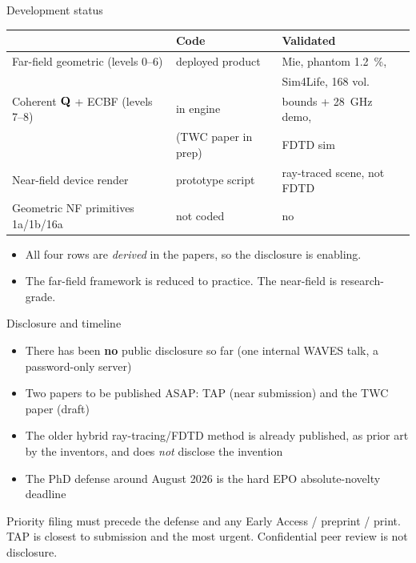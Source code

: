 \documentclass[aspectratio=169, 10pt]{beamer}
\begin{document}
\begin{frame}[t]{Development status}
  \vspace{4pt}
  \begin{center}\small\setlength{\tabcolsep}{4.5pt}
  \begin{tabular}{l l l}
    \toprule
    & Code & Validated \\
    \midrule
    Far-field geometric (levels 0--6) & deployed product & Mie, phantom \SI{1.2}{\percent}, \\
                                      &                   & Sim4Life, 168 vol. \\
    Coherent $\mathbf{Q}$ + ECBF (levels 7--8) & in engine & bounds + \SI{28}{\giga\hertz} demo, \\
                                        & (TWC paper in prep) & FDTD sim \\
    Near-field device render          & prototype script & ray-traced scene, not FDTD \\
    Geometric NF primitives 1a/1b/16a & not coded & no \\
    \bottomrule
  \end{tabular}
  \end{center}

  \vspace{6pt}
  \begin{itemize}
    \item All four rows are \emph{derived} in the papers, so the disclosure is enabling.
    \item The far-field framework is reduced to practice. The near-field is research-grade.
  \end{itemize}
\end{frame}

\begin{frame}{Disclosure and timeline}
  \begin{itemize}
    \item There has been \textbf{no} public disclosure so far (one internal WAVES talk, a password-only server)
    \item Two papers to be published ASAP: TAP (near submission) and the TWC paper (draft)
    \item The older hybrid ray-tracing/FDTD method is already published, as prior art by the inventors, and does \emph{not} disclose the invention
    \item The PhD defense around August 2026 is the hard EPO absolute-novelty deadline
  \end{itemize}
  \vspace{3pt}
  \begin{resultbox}\centering
    Priority filing must precede the defense and any Early Access / preprint / print. TAP is closest to submission and the most urgent. Confidential peer review is not disclosure.
  \end{resultbox}
\end{frame}
\end{document}

